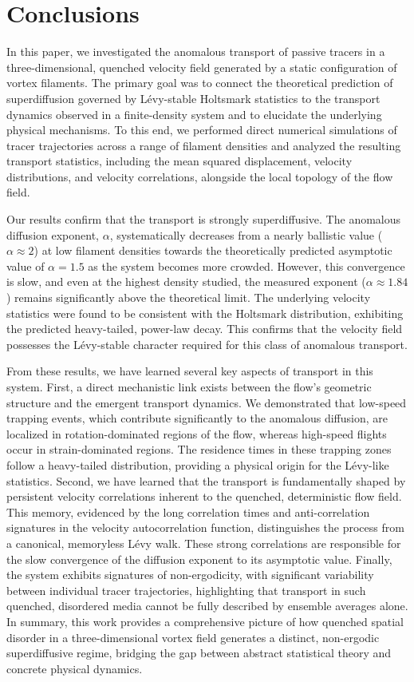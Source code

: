 \documentclass[]{article}
\begin{document}
\section{Conclusions}
\label{sec:conclusions}
In this paper, we investigated the anomalous transport of passive tracers in a three-dimensional, quenched velocity field generated by a static configuration of vortex filaments. The primary goal was to connect the theoretical prediction of superdiffusion governed by Lévy-stable Holtsmark statistics to the transport dynamics observed in a finite-density system and to elucidate the underlying physical mechanisms. To this end, we performed direct numerical simulations of tracer trajectories across a range of filament densities and analyzed the resulting transport statistics, including the mean squared displacement, velocity distributions, and velocity correlations, alongside the local topology of the flow field.

Our results confirm that the transport is strongly superdiffusive. The anomalous diffusion exponent, $\alpha$, systematically decreases from a nearly ballistic value ($\alpha \approx 2$) at low filament densities towards the theoretically predicted asymptotic value of $\alpha = 1.5$ as the system becomes more crowded. However, this convergence is slow, and even at the highest density studied, the measured exponent ($\alpha \approx 1.84$) remains significantly above the theoretical limit. The underlying velocity statistics were found to be consistent with the Holtsmark distribution, exhibiting the predicted heavy-tailed, power-law decay. This confirms that the velocity field possesses the Lévy-stable character required for this class of anomalous transport.

From these results, we have learned several key aspects of transport in this system. First, a direct mechanistic link exists between the flow's geometric structure and the emergent transport dynamics. We demonstrated that low-speed trapping events, which contribute significantly to the anomalous diffusion, are localized in rotation-dominated regions of the flow, whereas high-speed flights occur in strain-dominated regions. The residence times in these trapping zones follow a heavy-tailed distribution, providing a physical origin for the Lévy-like statistics. Second, we have learned that the transport is fundamentally shaped by persistent velocity correlations inherent to the quenched, deterministic flow field. This memory, evidenced by the long correlation times and anti-correlation signatures in the velocity autocorrelation function, distinguishes the process from a canonical, memoryless Lévy walk. These strong correlations are responsible for the slow convergence of the diffusion exponent to its asymptotic value. Finally, the system exhibits signatures of non-ergodicity, with significant variability between individual tracer trajectories, highlighting that transport in such quenched, disordered media cannot be fully described by ensemble averages alone. In summary, this work provides a comprehensive picture of how quenched spatial disorder in a three-dimensional vortex field generates a distinct, non-ergodic superdiffusive regime, bridging the gap between abstract statistical theory and concrete physical dynamics.


{}

\end{document}
